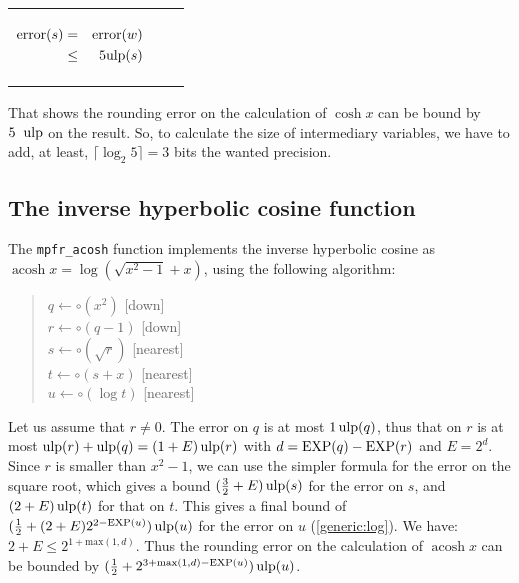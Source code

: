 \documentclass[12pt]{amsart}
\DeclareMathOperator{\acosh}{acosh}
\def\ulp{{\rm ulp}}
\def\Exp{{\rm EXP}}
\begin{document}
\begin{center}
\begin{tabular}{l l l}
\begin{minipage}{7.5cm}
\begin{center}


\begin{eqnarray}\nonumber
 {\textnormal{error}}(s) & = &  {\textnormal{error}}(w)\\\nonumber
 & \leq &  5\ulp(s)
\end{eqnarray}



\end{center}

\end{minipage} &
\begin{minipage}{6cm}


\end{minipage}


\end{tabular}
\end{center}

That shows the rounding error on the calculation of $\cosh x$ can be
bound by $5 \;\; \ulp$ on the result. So, to calculate the size of
intermediary variables, we have to add, at least, $\lceil \log_2 5 \rceil=3$ bits the wanted
precision.

\subsection{The inverse hyperbolic cosine function}

The {\tt mpfr\_acosh} function implements the inverse hyperbolic
cosine as $\acosh x = \log ( \sqrt{x^2-1} + x )$, using the following
algorithm:
\begin{quote}
$q \leftarrow \circ(x^2)$ [down] \\
$r \leftarrow \circ(q-1)$ [down] \\
$s \leftarrow \circ(\sqrt{r})$ [nearest] \\
$t \leftarrow \circ(s + x)$ [nearest] \\
$u \leftarrow \circ(\log t)$ [nearest]
\end{quote}

Let us assume that $r \ne 0$. The error on $q$ is at most $1\,\ulp(q)$,
thus that on $r$ is at most $\ulp(r) + \ulp(q) = (1+E)\,\ulp(r)$ with
$d = \Exp(q) - \Exp(r)$ and $E = 2^d$.
Since $r$ is smaller than $x^2-1$, we can use the simpler formula for the
error on the square root, which gives a bound $(\frac{3}{2} + E)\,\ulp(s)$
for the error on $s$, and $(2 + E)\,\ulp(t)$ for that on $t$. This gives
a final bound of $(\frac{1}{2} + (2 + E) 2^{2-\Exp(u)})\,\ulp(u)$ for the
error on $u$ (\textsection\ref{generic:log}).
We have: $2 + E \leq 2^{1 + \mathrm{max}(1,d)}$. Thus the rounding error
on the calculation of $\acosh x$ can be bounded by
$(\frac{1}{2} + 2^{3 + \mathrm{max}(1,d) - \Exp(u)})\,\ulp(u)$.
\end{document}

